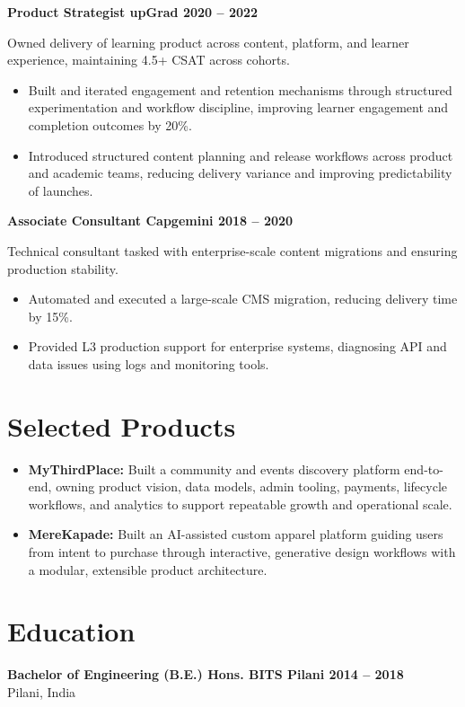 \documentclass[10pt,a4paper]{article}
\begin{document}
\textbf{Product Strategist \textbar{} upGrad \textbar{} 2020 -- 2022}

Owned delivery of learning product across content, platform, and learner experience, maintaining 4.5+ CSAT across cohorts.
\begin{itemize}
  \item Built and iterated engagement and retention mechanisms through structured experimentation and workflow discipline, improving learner engagement and completion outcomes by 20\%.
  \item Introduced structured content planning and release workflows across product and academic teams, reducing delivery variance and improving predictability of launches.
\end{itemize}

\textbf{Associate Consultant \textbar{} Capgemini \textbar{} 2018 -- 2020}

Technical consultant tasked with enterprise-scale content migrations and ensuring production stability.
\begin{itemize}
  \item Automated and executed a large-scale CMS migration, reducing delivery time by 15\%.
  \item Provided L3 production support for enterprise systems, diagnosing API and data issues using logs and monitoring tools.
\end{itemize}

\section*{Selected Products}
\begin{itemize}
  \item \textbf{MyThirdPlace:} Built a community and events discovery platform end-to-end, owning product vision, data models, admin tooling, payments, lifecycle workflows, and analytics to support repeatable growth and operational scale.
  \item \textbf{MereKapade:} Built an AI-assisted custom apparel platform guiding users from intent to purchase through interactive, generative design workflows with a modular, extensible product architecture.
\end{itemize}

\section*{Education}
\textbf{Bachelor of Engineering (B.E.) Hons. \textbar{} BITS Pilani \textbar{} 2014 -- 2018} \\
Pilani, India
\end{document}
